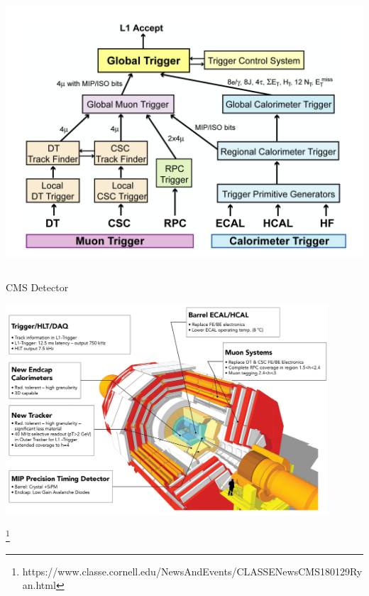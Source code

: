 \begin{frame}{}
\begin{columns}
    
    \includegraphics[width=\textwidth]{chapters/CMSExperiment/sectionTrigger/figures/trigger.png}
    \end{columns}
\end{frame}


\begin{frame}{CMS Detector}
    \begin{center}
        \includegraphics[width=0.9\textwidth]{slides/figures/CMS_NSF_DOE.jpeg}
    \end{center}
    \footnote{ https://www.classe.cornell.edu/NewsAndEvents/CLASSENewsCMS180129Ryan.html}
\end{frame}




